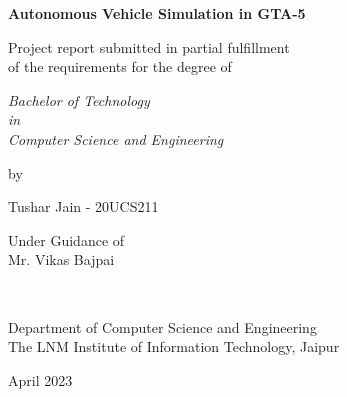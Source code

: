 \thispagestyle{empty}
\begin{center}
{\Large \bf Autonomous Vehicle Simulation in GTA-5}


\vspace*{1.75cm}
{\large Project report submitted in partial fulfillment\\}
{\large  of the requirements for the degree of \\}

\vspace*{1cm}
{\it {\large Bachelor of Technology} \\
{\large in\\}
{\large Computer Science and Engineering \\}}

\vspace*{1cm}
{\large by}

\vspace*{1cm}
{\large Tushar Jain - 20UCS211\\}


\vspace*{5mm}
{\large Under Guidance of \\}
{\large Mr. Vikas Bajpai \\}

\vspace*{1.0cm}
{\\}

\vspace*{2.0cm}
{\large Department of Computer Science and Engineering \\}
{\large The LNM Institute of Information Technology, Jaipur\\}

\vspace*{1.0cm}
{\large April 2023\\}
\end{center}

\clearpage
